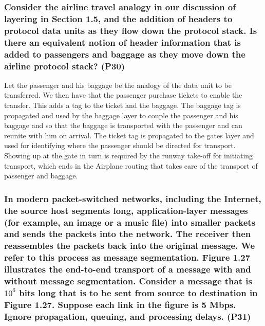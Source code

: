 \subsubsection{Consider the airline travel analogy in our discussion of layering in Section 1.5, and the addition of headers to protocol data units as they flow down the protocol stack. Is there an equivalent notion of header information that is added to passengers and baggage as they move down the airline protocol stack? (P30)}

Let the passenger and his baggage be the analogy of the data unit to be transferred. We then have that the passenger purchase tickets to enable the transfer. This adds a tag to the ticket and the baggage. The baggage tag is propagated and used by the baggage layer to couple the passenger and his baggage and so that the baggage is transported with the passenger and can reunite with him on arrival. The ticket tag is propagated to the gates layer and used for identifying where the passenger should be directed for transport. Showing up at the gate in turn is required by the runway take-off for initiating transport, which ends in the Airplane routing that takes care of the transport of passenger and baggage. 




\subsubsection{In modern packet-switched networks, including the Internet, the source host segments long, application-layer messages (for example, an image or a music file) into smaller packets and sends the packets into the network. The receiver then reassembles the packets back into the original message. We refer to this process as message segmentation. Figure 1.27 illustrates the end-to-end transport of a message with and without message segmentation. Consider a message that is $10^6$ bits long that is to be sent from source to destination in Figure 1.27. Suppose each link in the figure is 5 Mbps. Ignore propagation, queuing, and processing delays. (P31)}

